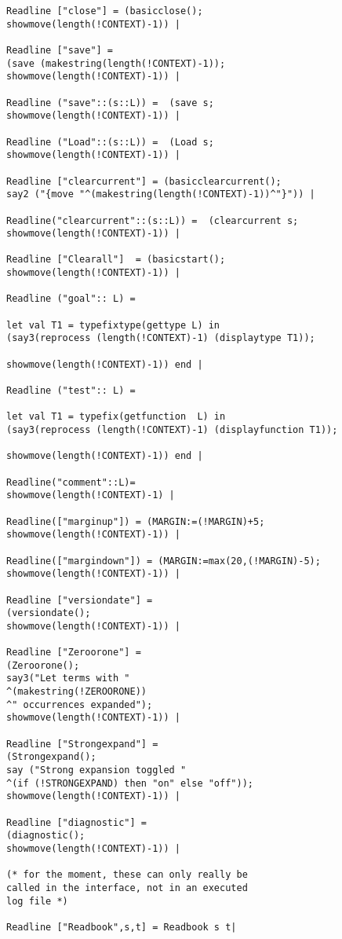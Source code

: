\documentclass[12pt]{article}
\begin{document}
\begin{verbatim}
Readline ["close"] = (basicclose();
showmove(length(!CONTEXT)-1)) |

Readline ["save"] =  
(save (makestring(length(!CONTEXT)-1));
showmove(length(!CONTEXT)-1)) |

Readline ("save"::(s::L)) =  (save s;
showmove(length(!CONTEXT)-1)) |

Readline ("Load"::(s::L)) =  (Load s;
showmove(length(!CONTEXT)-1)) |

Readline ["clearcurrent"] = (basicclearcurrent();
say2 ("{move "^(makestring(length(!CONTEXT)-1))^"}")) |

Readline("clearcurrent"::(s::L)) =  (clearcurrent s;
showmove(length(!CONTEXT)-1)) |

Readline ["Clearall"]  = (basicstart();
showmove(length(!CONTEXT)-1)) |

Readline ("goal":: L) = 

let val T1 = typefixtype(gettype L) in
(say3(reprocess (length(!CONTEXT)-1) (displaytype T1));

showmove(length(!CONTEXT)-1)) end |

Readline ("test":: L) = 

let val T1 = typefix(getfunction  L) in
(say3(reprocess (length(!CONTEXT)-1) (displayfunction T1));

showmove(length(!CONTEXT)-1)) end |

Readline("comment"::L)=
showmove(length(!CONTEXT)-1) |

Readline(["marginup"]) = (MARGIN:=(!MARGIN)+5;
showmove(length(!CONTEXT)-1)) |

Readline(["margindown"]) = (MARGIN:=max(20,(!MARGIN)-5);
showmove(length(!CONTEXT)-1)) |

Readline ["versiondate"] = 
(versiondate();
showmove(length(!CONTEXT)-1)) |

Readline ["Zeroorone"] = 
(Zeroorone();
say3("Let terms with "
^(makestring(!ZEROORONE))
^" occurrences expanded");
showmove(length(!CONTEXT)-1)) |

Readline ["Strongexpand"] = 
(Strongexpand();
say ("Strong expansion toggled "
^(if (!STRONGEXPAND) then "on" else "off"));
showmove(length(!CONTEXT)-1)) |

Readline ["diagnostic"] = 
(diagnostic();
showmove(length(!CONTEXT)-1)) |

(* for the moment, these can only really be
called in the interface, not in an executed
log file *)

Readline ["Readbook",s,t] = Readbook s t|


\end{verbatim}
\end{document}
